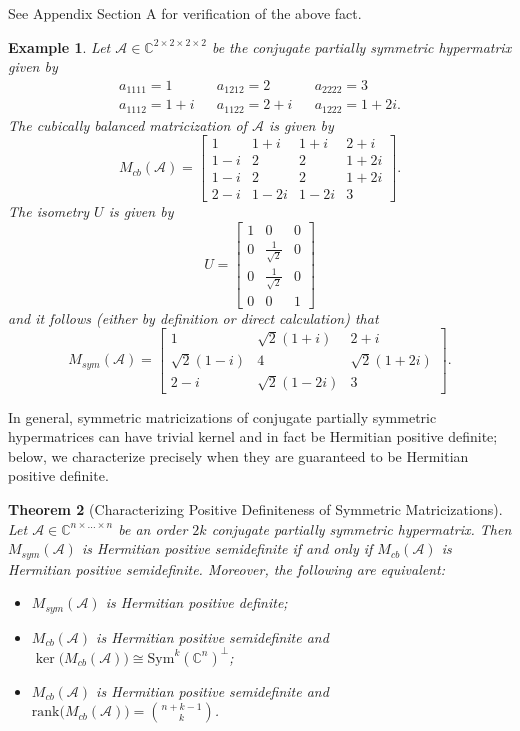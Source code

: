 \documentclass[11pt]{article}
\newtheorem{theorem}{Theorem}[section]
\newtheorem{example}[theorem]{Example}
\begin{document}
See Appendix Section A for verification of the above fact. 
\begin{example}
    Let $\mathcal{A}\in \mathbb{C}^{2\times 2\times 2\times 2}$ be the conjugate partially symmetric hypermatrix given by 
    \begin{align*}
        a_{1111} = 1 & & a_{1212} = 2 & & a_{2222} = 3 \\
        a_{1112} = 1+i & & a_{1122} = 2+i & & a_{1222} = 1+2i.
    \end{align*}
    The cubically balanced matricization of $\mathcal{A}$ is given by 
    \[M_{cb}(\mathcal{A}) = \left[\begin{array}{cccc}
        1 & 1+i & 1+i & 2+i \\
        1-i & 2 & 2 & 1+2i \\
        1-i & 2 & 2 & 1+2i \\
        2-i & 1-2i & 1-2i & 3
    \end{array}\right].\]
    The isometry $U$ is given by 
    \[U = \left[\begin{array}{ccc}
        1 & 0 & 0 \\
        0 & \frac{1}{\sqrt{2}} & 0 \\
        0 & \frac{1}{\sqrt{2}} & 0 \\
        0 & 0 & 1
    \end{array}\right]\]
    and it follows (either by definition or direct calculation) that 
    \[M_{sym}(\mathcal{A}) = \left[\begin{array}{ccc}
        1 & \sqrt{2}(1+i) & 2+i \\
        \sqrt{2}(1-i) & 4 & \sqrt{2}(1+2i) \\
        2-i & \sqrt{2}(1-2i) & 3
    \end{array}\right].\]
\end{example}
In general, symmetric matricizations of conjugate partially symmetric hypermatrices can have trivial kernel and in fact be Hermitian positive definite; below, we characterize precisely when they are guaranteed to be Hermitian positive definite. 
\begin{theorem}[Characterizing Positive Definiteness of Symmetric Matricizations]\label{Characterizing Positive Definiteness of Symmetric Matricizations}
    Let $\mathcal{A}\in \mathbb{C}^{n\times\dots\times n}$ be an order $2k$ conjugate partially symmetric hypermatrix. Then $M_{sym}(\mathcal{A})$ is Hermitian positive semidefinite if and only if $M_{cb}(\mathcal{A})$ is Hermitian positive semidefinite. Moreover, the following are equivalent:
    \begin{itemize}
        \item $M_{sym}(\mathcal{A})$ is Hermitian positive definite;
        \item $M_{cb}(\mathcal{A})$ is Hermitian positive semidefinite and $\ker\big(M_{cb}(\mathcal{A})\big) \cong \mathrm{Sym}^k(\mathbb{C}^n)^{\perp}$;
        \item $M_{cb}(\mathcal{A})$ is Hermitian positive semidefinite and $\mathrm{rank}\big(M_{cb}(\mathcal{A})\big) = \binom{n+k-1}{k}$. 
    \end{itemize}
\end{theorem}
\end{document}
